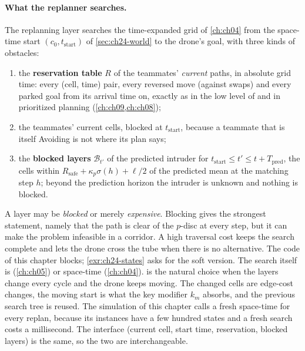 \paragraph{What the replanner searches.}
The replanning layer searches the time-expanded grid of \cref{ch:ch04} from
the space-time start $(c_0, t_{\mathrm{start}})$ of \cref{sec:ch24-world}
to the drone's goal, with three kinds of obstacles:
\begin{enumerate}
  \item the \textbf{reservation table} $R$ of the teammates' \emph{current}
  paths, in absolute grid time: every (cell, time) pair, every reversed move
  (against swaps) and every parked goal from its arrival time on, exactly as
  in the low level of \cbs and in prioritized planning (\cref{ch:ch09,ch:ch08});
  \item the teammates' current cells, blocked at $t_{\mathrm{start}}$,
  because a teammate that is itself Avoiding is not where its plan says;
  \item the \textbf{blocked layers} $\mathcal{B}_{t'}$
  of the predicted intruder for $t_{\mathrm{start}} \le t' \le t + T_{\mathrm{pred}}$,
  the cells within $R_{\mathrm{safe}} + \kappa_p\sigma(h) + \ell/2$ of the
  predicted mean at the matching step $h$; beyond the prediction horizon the
  intruder is unknown and nothing is blocked.
\end{enumerate}
A layer may be \emph{blocked} or merely \emph{expensive}. Blocking gives the
strongest statement, namely that the path is clear of the $p$-disc at every
step, but it can make the problem infeasible in a corridor. A high traversal
cost keeps the search complete and lets the drone cross the tube when there
is no alternative. The code of this chapter blocks; \cref{exr:ch24-states} asks
for the soft version. The search itself is \dstarlite \cite{koenig2002dstarlite}
(\cref{ch:ch05}) or space-time \astar (\cref{ch:ch04}). \dstarlite is the natural choice when the
layers change every cycle and the drone keeps moving. The changed cells are
edge-cost changes, the moving start is what the key modifier $k_m$ absorbs,
and the previous search tree is reused. The simulation of this chapter
calls a fresh space-time \astar for every replan, because its instances have
a few hundred states and a fresh search costs a millisecond. The interface
(current cell, start time, reservation, blocked layers) is the same, so the
two are interchangeable.

